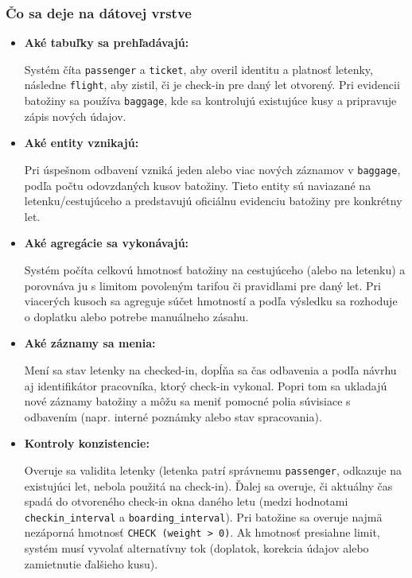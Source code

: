 \documentclass[11pt, a4paper]{article}
\begin{document}
\subsubsection*{Čo sa deje na dátovej vrstve}
\begin{itemize}
    \item \textbf{Aké tabuľky sa prehľadávajú:} 
    
    Systém číta \texttt{passenger} a \texttt{ticket}, aby overil identitu a platnosť letenky, následne \texttt{flight}, aby zistil, či je check-in pre daný let otvorený. Pri evidencii batožiny sa používa \texttt{baggage}, kde sa kontrolujú existujúce kusy a pripravuje zápis nových údajov.
    
    \item \textbf{Aké entity vznikajú:} 
    
    Pri úspešnom odbavení vzniká jeden alebo viac nových záznamov v \texttt{baggage}, podľa počtu odovzdaných kusov batožiny. Tieto entity sú naviazané na letenku/cestujúceho a predstavujú oficiálnu evidenciu batožiny pre konkrétny let.
    
    \item \textbf{Aké agregácie sa vykonávajú:}
    
    Systém počíta celkovú hmotnosť batožiny na cestujúceho (alebo na letenku) a porovnáva ju s limitom povoleným tarifou či pravidlami pre daný let. Pri viacerých kusoch sa agreguje súčet hmotností a podľa výsledku sa rozhoduje o doplatku alebo potrebe manuálneho zásahu.
    
    \item \textbf{Aké záznamy sa menia:} 
    
    Mení sa stav letenky na checked-in, dopĺňa sa čas odbavenia a podľa návrhu aj identifikátor pracovníka, ktorý check-in vykonal. Popri tom sa ukladajú nové záznamy batožiny a môžu sa meniť pomocné polia súvisiace s odbavením (napr. interné poznámky alebo stav spracovania).
    
    \item \textbf{Kontroly konzistencie:} 

    Overuje sa validita letenky (letenka patrí správnemu \texttt{passenger}, odkazuje na existujúci let, nebola použitá na check-in).
    Ďalej sa overuje, či aktuálny čas spadá do otvoreného check-in okna daného letu (medzi hodnotami \texttt{checkin\_interval} a \texttt{boarding\_interval}).
    Pri batožine sa overuje najmä nezáporná hmotnosť \texttt{CHECK (weight > 0)}. Ak hmotnosť presiahne limit, systém musí vyvolať alternatívny tok (doplatok, korekcia údajov alebo zamietnutie ďalšieho kusu).
\end{itemize}
\end{document}
